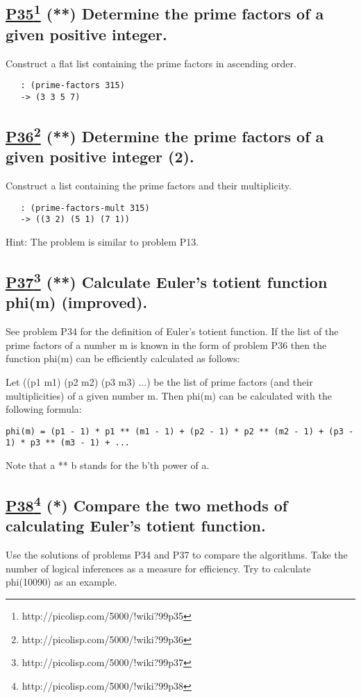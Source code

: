 \documentclass[10pt,a4paper]{article}
\begin{document}
\subsection*{\underline{P35}\footnote{http://picolisp.com/5000/!wiki?99p35} (**) Determine the prime factors of a given positive integer.}
Construct a flat list containing the prime factors
in ascending order.
\begin{verbatim}
   : (prime-factors 315)
   -> (3 3 5 7)
\end{verbatim}


\subsection*{\underline{P36}\footnote{http://picolisp.com/5000/!wiki?99p36} (**) Determine the prime factors of a given positive integer (2).}
Construct a list containing the prime factors and their multiplicity.
\begin{verbatim}
   : (prime-factors-mult 315)
   -> ((3 2) (5 1) (7 1))
\end{verbatim}

Hint: The problem is similar to problem P13.

\subsection*{\underline{P37}\footnote{http://picolisp.com/5000/!wiki?99p37} (**) Calculate Euler's totient function phi(m) (improved).}
See problem P34 for the definition of Euler's totient function.
If the list of the prime factors of a number m is known in the form
of problem P36 then the function phi(m) can be efficiently
calculated as follows:

Let ((p1 m1) (p2 m2) (p3 m3) ...) be the list of prime factors (and
their multiplicities) of a given number m. Then phi(m) can be calculated
with the following formula:
\begin{verbatim}
phi(m) = (p1 - 1) * p1 ** (m1 - 1) + (p2 - 1) * p2 ** (m2 - 1) + (p3 - 1) * p3 ** (m3 - 1) + ...
\end{verbatim}

Note that a ** b stands for the b'th power of a.

\subsection*{\underline{P38}\footnote{http://picolisp.com/5000/!wiki?99p38} (*) Compare the two methods of calculating Euler's totient function.}
Use the solutions of problems P34 and P37 to compare the algorithms.
Take the number of logical inferences as a measure for efficiency.
Try to calculate phi(10090) as an example.
\end{document}

